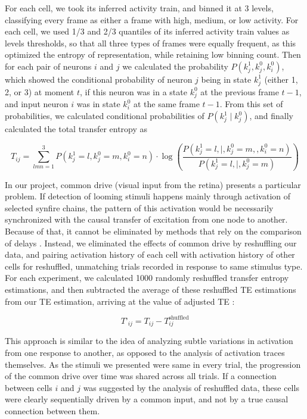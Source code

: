\documentclass{article}
\begin{document}
For each cell, we took its inferred activity train, and binned it at 3 levels, classifying every frame as either a frame with high, medium, or low activity. For each cell, we used 1/3 and 2/3 quantiles of its inferred activity train values as levels thresholds, so that all three types of frames were equally frequent, as this optimized the entropy of representation, while retaining low binning count. Then for each pair of neurons $i$ and $j$ we calculated the probability $P(k_j^1,k_j^0,k_i^0)$, which showed the conditional probability of neuron $j$ being in state $k_j^1$ (either 1, 2, or 3) at moment $t$, if this neuron was in a state $k_j^0$ at the previous frame $t-1$, and  input neuron $i$ was in state $k_i^0$ at the same frame $t-1$. From this set of probabilities, we calculated conditional probabilities of $P(k_j^1 \mid k_j^0)$, and finally calculated the total transfer entropy as

$$T_{ij} = \sum_{lmn=1}^3{P(k_j^1=l,k_j^0=m,k_i^0=n)}\cdot \log\left(\frac{P(k_j^1=l , \mid , k_j^0=m, , k_i^0=n)}{P(k_j^1=l , \mid , k_j^0=m)}\right)$$

In our project, common drive (visual input from the retina) presents a particular problem. If detection of looming stimuli happens mainly through activation of selected synfire chains, the pattern of this activation would be necessarily synchronized with the causal transfer of excitation from one node to another. Because of that, it cannot be eliminated by methods that rely on the comparison of delays \citep{wollstadt2014te}. Instead, we eliminated the effects of common drive by reshuffling our data, and pairing activation history of each cell with activation history of other cells for reshuffled, unmatching trials recorded in response to same stimulus type. For each experiment, we calculated 1000 randomly reshuffled transfer entropy estimations, and then subtracted the average of these reshuffled TE estimations from our TE estimation, arriving at the value of adjusted TE \citep{gourevitch2007te}:

$$T’_{ij} = T_{ij} - T^{\text{shuffled}}_{ij}$$

This approach is similar to the idea of analyzing subtle variations in activation from one response to another, as opposed to the analysis of activation traces themselves. As the stimuli we presented were same in every trial, the progression of the common drive over time was shared across all trials. If a connection between cells $i$ and $j$ was suggested by the analysis of reshuffled data, these cells were clearly sequentially driven by a common input, and not by a true causal connection between them.
\end{document}
